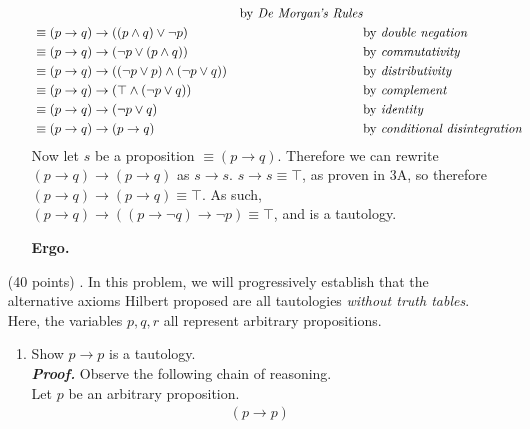 \documentclass[11pt,a4paper]{article}
\begin{document}
\begin{enumerate}
\begin{enumerate}
\begin{align*}
            &\quad
            &\text{by \emph{De Morgan's Rules}} \\
        &\equiv (p \rightarrow q) \rightarrow ((p \land q) \lor \neg p)
            &\quad
            &\text{by \emph{double negation}} \\
        &\equiv (p \rightarrow q) \rightarrow (\neg p \lor (p \land q))
            &\quad
            &\text{by \emph{commutativity}} \\
        &\equiv (p \rightarrow q) \rightarrow ((\neg p \lor p) \land (\neg p \lor q))
            &\quad
            &\text{by \emph{distributivity}} \\
        &\equiv (p \rightarrow q) \rightarrow (\top \land (\neg p \lor q))
            &\quad
            &\text{by \emph{complement}} \\
        &\equiv (p \rightarrow q) \rightarrow (\neg p \lor q)
            &\quad
            &\text{by \emph{identity}} \\
        &\equiv (p \rightarrow q) \rightarrow (p \rightarrow q)
            &\quad
            &\text{by \emph{conditional disintegration}} \\
    \end{align*}
    Now let $s$ be a proposition $\equiv (p \rightarrow q)$. Therefore we can rewrite $(p \rightarrow q) \rightarrow (p \rightarrow q)$ as $s \rightarrow s$. $s \rightarrow s \equiv \top$, as proven in 3A, so therefore $(p \rightarrow q) \rightarrow (p \rightarrow q) \equiv \top$. As such, $(p \rightarrow q) \rightarrow ((p \rightarrow \neg q) \rightarrow \neg p) \equiv \top$, and is a tautology. 
        \begin{flushright}
            \textbf{Ergo.}
        \end{flushright}
    \end{enumerate}
    \item[(40 points) \quad 3.]
    In this problem, we will progressively establish that the alternative axioms Hilbert proposed are all tautologies \emph{without truth tables}. Here, the variables $p, q, r$ all represent arbitrary propositions.
    \begin{enumerate}
        \item
        Show $p \rightarrow p$ is a tautology. \\
        \emph{\textbf{Proof.}} Observe the following chain of reasoning. \\ 
        Let $p$ be an arbitrary proposition.
        \begin{align*}
        (p \rightarrow p)

\end{align*}
\end{enumerate}
\end{enumerate}
\end{document}
